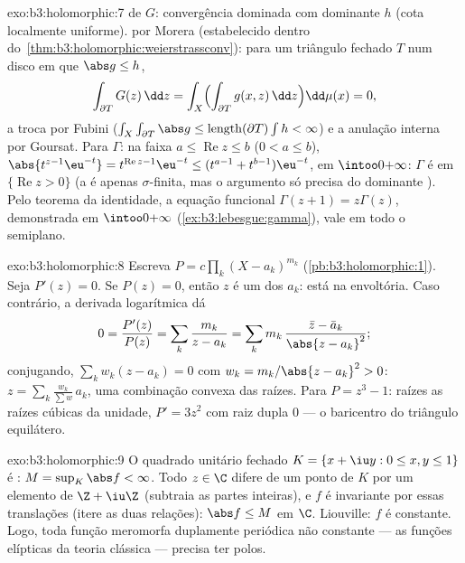 \begin{solution}{exo:b3:holomorphic:7}
 de $G$: convergência dominada com dominante $h$
(cota localmente uniforme).  por Morera (estabelecido
dentro do~\cref{thm:b3:holomorphic:weierstrassconv}): para um
triângulo fechado $T$ num disco em que $\abs g \leq h$,
\[
\int_{\partial T}G(z)\,\dd z =
\int_X\Bigl(\int_{\partial T}g(x, z)\,\dd z\Bigr)\dd\mu(x) =
0,
\]
a troca por Fubini ($\int_X\int_{\partial T}\abs
g \leq \operatorname{length}(\partial T)\int h < \infty$) e
a anulação interna por Goursat. Para $\Gamma$: na faixa $a
\leq \operatorname{Re}z \leq b$ ($0 < a \leq b$),
$\abs{t^{z-1}\eu^{-t}} = t^{\operatorname{Re}z-1}\eu^{-t} \leq
(t^{a-1} + t^{b-1})\eu^{-t}$,  em
$\intoo0{+\infty}$: $\Gamma$ é  em
$\{\operatorname{Re} z > 0\}$ (a  é apenas
$\sigma$-finita, mas o argumento só precisa do dominante
). Pelo teorema da identidade, a equação funcional
$\Gamma(z + 1) = z\Gamma(z)$, demonstrada em
$\intoo0{+\infty}$ (\cref{ex:b3:lebesgue:gamma}), vale em todo o
semiplano.
\end{solution}

\begin{solution}{exo:b3:holomorphic:8}
Escreva $P = c\prod_k(X - a_k)^{m_k}$
(\cref{pb:b3:holomorphic:1}). Seja $P'(z) = 0$. Se $P(z) = 0$,
então $z$ é um dos $a_k$: está na envoltória. Caso contrário, a
derivada logarítmica dá
\[
0 = \frac{P'(z)}{P(z)} = \sum_k\frac{m_k}{z - a_k}
= \sum_k m_k\,\frac{\bar z - \bar a_k}{\abs{z - a_k}^2} ;
\]
conjugando, $\sum_kw_k(z - a_k) = 0$ com $w_k = m_k/\abs{z -
a_k}^2 > 0$: $z = \sum_k\frac{w_k}{\sum w}\,a_k$, uma combinação
convexa das raízes. Para $P = z^3 - 1$: raízes as raízes cúbicas
da unidade, $P' = 3z^2$ com raiz dupla $0$ --- o
baricentro do triângulo equilátero.
\end{solution}

\begin{solution}{exo:b3:holomorphic:9}
O quadrado unitário fechado $K = \{x + \iu y : 0 \leq x, y \leq
1\}$ é : $M = \sup_K\abs f < \infty$. Todo $z \in \C$
difere de um ponto de $K$ por um elemento de $\Z + \iu\Z$
(subtraia as partes inteiras), e $f$ é invariante por essas
translações (itere as duas relações): $\abs f \leq M$ em
$\C$. Liouville: $f$ é constante. Logo, toda função meromorfa
duplamente periódica não constante --- as funções elípticas
da teoria clássica --- precisa ter polos.
\end{solution}

